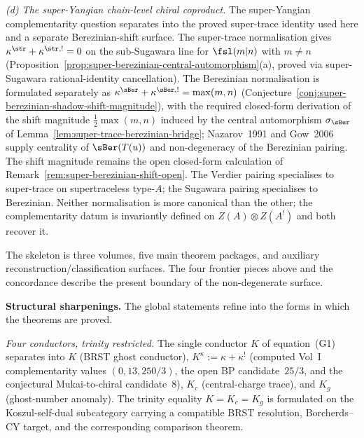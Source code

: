 \noindent\emph{(d) The super-Yangian chain-level chiral
coproduct.}\enspace
The super-Yangian complementarity question separates into the
proved super-trace identity used here and a separate Berezinian-shift
surface. The
super-trace normalisation gives
$\kappa^{\str} + \kappa^{\str,!} = 0$ on the sub-Sugawara line
for $\fsl(m|n)$ with $m\neq n$
(Proposition~\ref{prop:super-berezinian-central-automorphism}(a),
proved via super-Sugawara rational-identity cancellation). The
Berezinian normalisation is formulated separately as
$\kappa^{\sBer} + \kappa^{\sBer,!} = \max(m,n)$
(Conjecture~\ref{conj:super-berezinian-shadow-shift-magnitude}),
with the required closed-form derivation of the shift magnitude
$\tfrac{1}{2}\max(m,n)$ induced by the central automorphism
$\sigma_{\sBer}$ of
Lemma~\ref{lem:super-trace-berezinian-bridge}; Nazarov~1991 and
Gow~2006 supply centrality of $\sBer(T(u))$ and non-degeneracy of
the Berezinian pairing.  The shift magnitude remains the open
closed-form calculation of
Remark~\ref{rem:super-berezinian-shift-open}. The Verdier pairing specialises
to super-trace on supertraceless type-$A$; the Sugawara pairing
specialises to Berezinian. Neither normalisation is more
canonical than the other; the complementarity datum is
invariantly defined on $Z(A) \otimes Z(A^{!})$ and both recover
it.

\medskip

\noindent
The skeleton is three volumes, five main theorem packages, and
auxiliary reconstruction/classification surfaces. The four frontier
pieces above and the concordance describe the present boundary of the
non-degenerate surface.

\medskip

\noindent\textbf{Structural sharpenings.}\enspace
The global statements refine into the forms in which the
theorems are proved.

\emph{Four conductors, trinity restricted.} The single conductor
$K$ of equation~(G1) separates into $K$ (BRST ghost conductor),
$K^\kappa := \kappa+\kappa^!$ (computed Vol~I complementarity values
$(0,13,250/3)$, the open BP candidate~$25/3$, and the conjectural
Mukai-to-chiral candidate~$8$),
$K_c$ (central-charge trace), and $K_g$ (ghost-number anomaly). The
trinity equality $K=K_c=K_g$ is formulated on the
Koszul-self-dual subcategory carrying a compatible BRST resolution,
Borcherds--CY target, and the corresponding comparison theorem.

